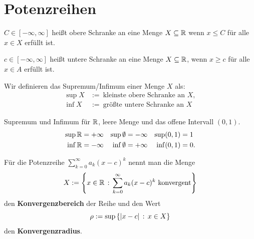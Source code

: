 

\section{Potenzreihen} 

\begin{defn} 
	$C \in [-\infty,\infty]$ heißt obere Schranke an eine Menge $X \subseteq \mathbb{R}$ wenn $x \le C$ für alle $x \in X$ erfüllt ist.
	
	$c \in [-\infty,\infty]$ heißt untere Schranke an eine Menge $X \subseteq \mathbb{R}$, wenn $x \ge c$ für alle $x \in A$ erfüllt ist. 
	
	Wir definieren das Supremum/Infimum einer Menge $X$ als:
	\begin{align*}
		\sup X & :=  \ \text{kleinste obere Schranke an $X$},
	\\	\inf X  & := \ \text{größte untere Schranke an $X$}
	\end{align*}
\end{defn} 

\begin{bsp}
	Supremum und Infimum für $\mathbb{R}$, leere Menge und das offene Intervall $(0,1)$. 
	\begin{align*}
		\sup \mathbb{R} & = + \infty  &  \sup \emptyset & = - \infty & \sup (0,1) & = 1
		\\ \inf \mathbb{R} & = -\infty & \inf \emptyset & = +\infty & \inf (0,1)  & = 0. 
	\end{align*}
\end{bsp} 

\begin{defn}
	Für die Potenzreihe $\sum_{k=0}^\infty a_k (x-c)^k$ nennt man die Menge 
	\[
		 X:= \left\{ x \in \mathbb{R} \,:\, \sum_{k=0}^\infty a_k (x-c)^k \ \text{konvergent} \right\} 
	\]
	den \textbf{Konvergenzbereich} der Reihe und den Wert 
	\[
		\rho := \sup \left\{ |x-c| \,:\, x \in X \right\}
	\]
	den \textbf{Konvergenzradius}. 
\end{defn} 

